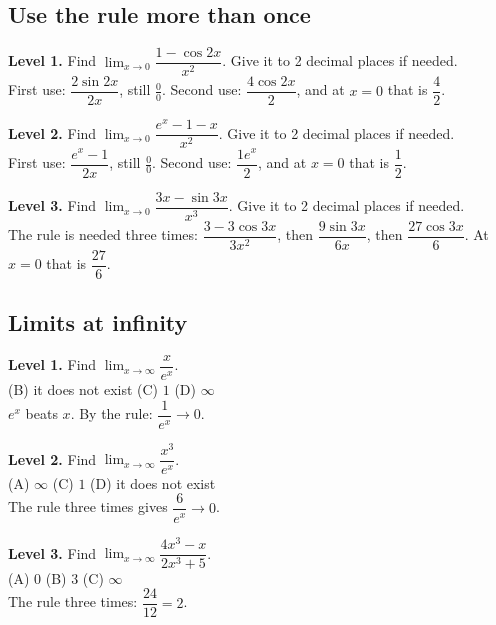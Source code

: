 \documentclass[11pt]{article}
\begin{document}
\subsection*{Use the rule more than once}
\noindent\textbf{Level 1.} Find $\displaystyle\lim_{x\to0}\dfrac{1-\cos 2x}{x^2}$. Give it to 2 decimal places if needed.\\  \quad First use: $\dfrac{2\sin 2x}{2x}$, still $\frac00$. Second use: $\dfrac{4\cos 2x}{2}$, and at $x=0$ that is $\dfrac{4}{2}$.\par\medskip
\noindent\textbf{Level 2.} Find $\displaystyle\lim_{x\to0}\dfrac{e^{x}-1-x}{x^2}$. Give it to 2 decimal places if needed.\\  \quad First use: $\dfrac{e^{x}-1}{2x}$, still $\frac00$. Second use: $\dfrac{1e^{x}}{2}$, and at $x=0$ that is $\dfrac{1}{2}$.\par\medskip
\noindent\textbf{Level 3.} Find $\displaystyle\lim_{x\to0}\dfrac{3x-\sin 3x}{x^3}$. Give it to 2 decimal places if needed.\\  \quad The rule is needed three times: $\dfrac{3-3\cos 3x}{3x^2}$, then $\dfrac{9\sin 3x}{6x}$, then $\dfrac{27\cos 3x}{6}$. At $x=0$ that is $\dfrac{27}{6}$.\par\medskip
\subsection*{Limits at infinity}
\noindent\textbf{Level 1.} Find $\displaystyle\lim_{x\to\infty}\dfrac{x}{e^x}$.\\  \quad (B) it does not exist \quad (C) $1$ \quad (D) $\infty$\\  \quad $e^x$ beats $x$. By the rule: $\dfrac{1}{e^x}\to0$.\par\medskip
\noindent\textbf{Level 2.} Find $\displaystyle\lim_{x\to\infty}\dfrac{x^3}{e^x}$.\\ (A) $\infty$ \quad {} \quad (C) $1$ \quad (D) it does not exist\\  \quad The rule three times gives $\dfrac{6}{e^x}\to0$.\par\medskip
\noindent\textbf{Level 3.} Find $\displaystyle\lim_{x\to\infty}\dfrac{4x^3-x}{2x^3+5}$.\\ (A) $0$ \quad (B) $3$ \quad (C) $\infty$ \quad {}\\  \quad The rule three times: $\dfrac{24}{12}=2$.\par\medskip
\end{document}
